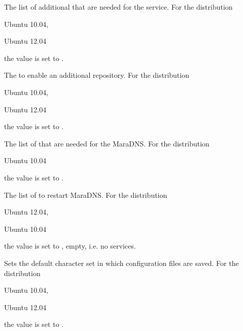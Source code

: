 The list of additional  that are needed for the service. 
For the distribution
\begin{inparaitem}
\item[\TheDistribution{ubuntu}] Ubuntu 10.04,
\item[\TheDistribution{ubuntu}] Ubuntu 12.04
\end{inparaitem}
the value is set to .


The  to enable an additional repository.
For the distribution
\begin{inparaitem}
\item[\TheDistribution{ubuntu}] Ubuntu 10.04,
\item[\TheDistribution{ubuntu}] Ubuntu 12.04
\end{inparaitem}
the value is set to .


The list of  that are needed for the MaraDNS.
For the distribution
\begin{inparaitem}
\item[\TheDistribution{ubuntu}] Ubuntu 10.04
\end{inparaitem}
the value is set to .


The list of  to restart MaraDNS.
For the distribution
\begin{inparaitem}
\item[\TheDistribution{ubuntu}] Ubuntu 12.04,
\item[\TheDistribution{ubuntu}] Ubuntu 10.04
\end{inparaitem}
the value is set to \qcode{}, empty, i.e. no services.


Sets the default character set  in which configuration files are 
saved. For the distribution
\begin{inparaitem}
\item[\TheDistribution{ubuntu}] Ubuntu 10.04,
\item[\TheDistribution{ubuntu}] Ubuntu 12.04
\end{inparaitem}
the value is set to .

